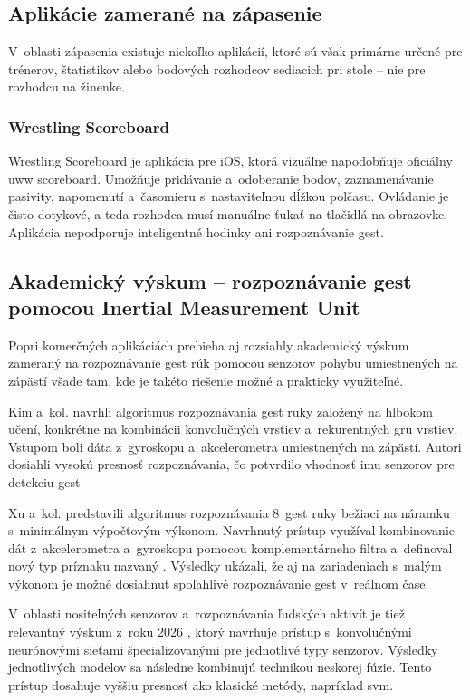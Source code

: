 \subsection{Aplikácie zamerané na zápasenie}

V~oblasti zápasenia existuje niekoľko aplikácií, ktoré sú však
primárne určené pre trénerov, štatistikov alebo bodových
rozhodcov sediacich pri stole -- nie pre rozhodcu na žinenke.

\subsubsection{Wrestling Scoreboard}
Wrestling Scoreboard \cite{wrestling_scoreboard} je aplikácia pre iOS, ktorá vizuálne
napodobňuje oficiálny \Gls{uww} scoreboard. Umožňuje pridávanie
a~odoberanie bodov, zaznamenávanie pasivity, napomenutí a~časomieru
s~nastaviteľnou dĺžkou polčasu. Ovládanie je čisto dotykové, a teda
rozhodca musí manuálne ťukať na tlačidlá na
obrazovke. Aplikácia nepodporuje inteligentné hodinky ani
rozpoznávanie gest.

\subsection{Akademický výskum -- rozpoznávanie gest pomocou Inertial Measurement Unit}

Popri komerčných aplikáciách prebieha aj rozsiahly akademický 
výskum zameraný na rozpoznávanie gest rúk pomocou senzorov 
pohybu umiestnených na zápästí všade tam, kde je takéto riešenie 
možné a prakticky využiteľné.

Kim a~kol. \cite{deepgesture} navrhli algoritmus rozpoznávania gest ruky
založený na hlbokom učení, konkrétne na kombinácii konvolučných
vrstiev a~rekurentných \Gls{gru} vrstiev. Vstupom boli dáta
z~gyroskopu a~akcelerometra umiestnených na zápästí. Autori
dosiahli vysokú presnosť rozpoznávania, čo potvrdilo vhodnosť
\Gls{imu} senzorov pre detekciu gest 

Xu a~kol. \cite{hand_gesture_wristband} predstavili algoritmus rozpoznávania 8~gest
ruky bežiaci na náramku s~minimálnym výpočtovým výkonom.
Navrhnutý prístup využíval kombinovanie dát z~akcelerometra
a~gyroskopu pomocou komplementárneho filtra a~definoval nový
typ príznaku nazvaný . Výsledky ukázali,
že aj na zariadeniach s~malým výkonom je možné dosiahnuť
spoľahlivé rozpoznávanie gest v~reálnom čase


V~oblasti nositeľných senzorov a~rozpoznávania ľudských aktivít
je tiež relevantný výskum z~roku 2026 \cite{wearable_sensors_ai},
ktorý navrhuje prístup s~konvolučnými neurónovými sieťami špecializovanými pre
jednotlivé typy senzorov. Výsledky jednotlivých modelov sa
následne kombinujú technikou neskorej fúzie. Tento prístup
dosahuje vyššiu presnosť ako klasické metódy, napríklad
\Gls{svm}.

